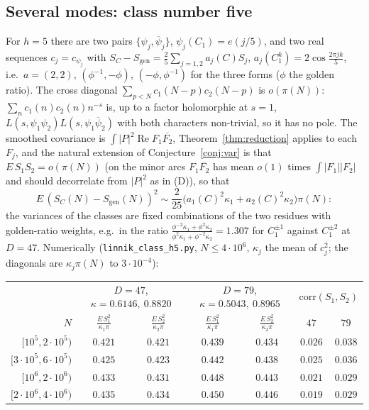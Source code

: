﻿\documentclass[11pt]{amsart}
\theoremstyle{remark}
\begin{document}
\subsection{Several modes: class number five}\label{subsec:h5}
For $h=5$ there are two pairs $\{\psi_j,\overline\psi_j\}$, $\psi_j(C_1)=e(j/5)$, and two real sequences $c_j=c_{\psi_j}$ with $S_C-S_\mathrm{gen}=\frac25\sum_{j=1,2}a_j(C)S_j$, $a_j(C_1^k)=2\cos\frac{2\pi jk}5$, i.e.\ $a=(2,2)$, $(\phi^{-1},-\phi)$, $(-\phi,\phi^{-1})$ for the three forms ($\phi$ the golden ratio). The cross diagonal $\sum_{p<N}c_1(N-p)c_2(N-p)$ is $o(\pi(N))$: $\sum_nc_1(n)c_2(n)n^{-s}$ is, up to a factor holomorphic at $s=1$, $L(s,\psi_1\psi_2)L(s,\psi_1\overline\psi_2)$ with both characters non-trivial, so it has no pole. The smoothed covariance is $\int|P|^2\operatorname{Re}F_1\overline{F_2}$, Theorem~\ref{thm:reduction} applies to each $F_j$, and the natural extension of Conjecture~\ref{conj:var} is that $E\,S_1S_2=o(\pi(N))$ (on the minor arcs $F_1\overline{F_2}$ has mean $o(1)$ times $\int|F_1||F_2|$ and should decorrelate from $|P|^2$ as in (D)), so that
\[
E\,(S_C(N)-S_\mathrm{gen}(N))^2\sim\frac2{25}\bigl(a_1(C)^2\kappa_1+a_2(C)^2\kappa_2\bigr)\pi(N):
\]
the variances of the classes are fixed combinations of the two residues with golden-ratio weights, e.g.\ in the ratio $\frac{\phi^{-2}\kappa_1+\phi^2\kappa_2}{\phi^2\kappa_1+\phi^{-2}\kappa_2}=1.307$ for $C_1^{\pm1}$ against $C_1^{\pm2}$ at $D=47$. Numerically (\texttt{linnik\_class\_h5.py}, $N\le4\cdot10^6$, $\kappa_j$ the mean of $c_j^2$; the diagonals are $\kappa_j\pi(N)$ to $3\cdot10^{-4}$):
\begin{center}\footnotesize
\begin{tabular}{r|cc|cc|cc}
\toprule
& \multicolumn{2}{c|}{$D=47$, $\kappa=0.6146,\ 0.8820$} & \multicolumn{2}{c|}{$D=79$, $\kappa=0.5043,\ 0.8965$} & \multicolumn{2}{c}{$\mathrm{corr}(S_1,S_2)$}\\
$N$ & $\frac{E\,S_1^2}{\kappa_1\pi}$ & $\frac{E\,S_2^2}{\kappa_2\pi}$ & $\frac{E\,S_1^2}{\kappa_1\pi}$ & $\frac{E\,S_2^2}{\kappa_2\pi}$ & $47$ & $79$\\
\midrule
$[10^5,2\cdot10^5)$ & $0.421$ & $0.421$ & $0.439$ & $0.434$ & $0.026$ & $0.038$\\
$[3\cdot10^5,6\cdot10^5)$ & $0.425$ & $0.423$ & $0.442$ & $0.438$ & $0.025$ & $0.036$\\
$[10^6,2\cdot10^6)$ & $0.433$ & $0.431$ & $0.448$ & $0.443$ & $0.021$ & $0.029$\\
$[2\cdot10^6,4\cdot10^6)$ & $0.435$ & $0.434$ & $0.450$ & $0.446$ & $0.019$ & $0.029$\\
\bottomrule
\end{tabular}
\end{center}
\end{document}
